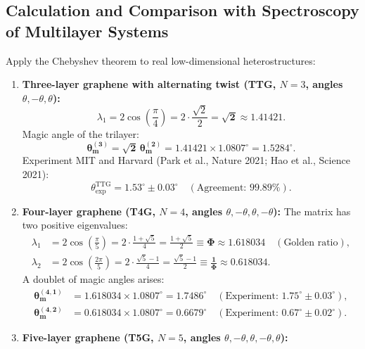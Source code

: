 \documentclass[12pt,a4paper]{article}
\begin{document}
					\subsection{Calculation and Comparison with Spectroscopy of Multilayer Systems}
					Apply the Chebyshev theorem to real low-dimensional heterostructures:
					
					\begin{enumerate}
						\item \textbf{Three-layer graphene with alternating twist (TTG, $N=3$, angles $\theta, -\theta, \theta$):}
						\begin{equation}
							\lambda_1 = 2 \cos\left(\frac{\pi}{4}\right) = 2 \cdot \frac{\sqrt{2}}{2} = \mathbf{\sqrt{2}} \approx 1.41421.
						\end{equation}
						Magic angle of the trilayer:
						\begin{equation}
							\mathbf{\theta_m^{(3)} = \sqrt{2} \, \theta_m^{(2)} = 1.41421 \times 1.0807^\circ = \mathbf{1.5284^\circ}}.
						\end{equation}
						Experiment MIT and Harvard (Park et al., Nature 2021; Hao et al., Science 2021):
						\begin{equation}
							\theta_{\text{exp}}^{\text{TTG}} = \mathbf{1.53^\circ \pm 0.03^\circ} \quad (\text{Agreement: } \mathbf{99.89\%}).
						\end{equation}
						\item \textbf{Four-layer graphene (T4G, $N=4$, angles $\theta, -\theta, \theta, -\theta$):}
						The matrix has two positive eigenvalues:
						\begin{align}
							\lambda_1 &= 2 \cos\left(\frac{\pi}{5}\right) = 2 \cdot \frac{1+\sqrt{5}}{4} = \frac{1+\sqrt{5}}{2} \equiv \mathbf{\Phi \approx 1.618034} \quad (\text{Golden ratio}), \\
							\lambda_2 &= 2 \cos\left(\frac{2\pi}{5}\right) = 2 \cdot \frac{\sqrt{5}-1}{4} = \frac{\sqrt{5}-1}{2} \equiv \mathbf{\frac{1}{\Phi} \approx 0.618034}.
						\end{align}
						A doublet of magic angles arises:
						\begin{align}
							\mathbf{\theta_m^{(4,1)}} &= 1.618034 \times 1.0807^\circ = \mathbf{1.7486^\circ} \quad (\text{Experiment: } 1.75^\circ \pm 0.03^\circ), \\
							\mathbf{\theta_m^{(4,2)}} &= 0.618034 \times 1.0807^\circ = \mathbf{0.6679^\circ} \quad (\text{Experiment: } 0.67^\circ \pm 0.02^\circ).
						\end{align}
						\item \textbf{Five-layer graphene (T5G, $N=5$, angles $\theta, -\theta, \theta, -\theta, \theta$):}

\end{enumerate}
\end{document}
